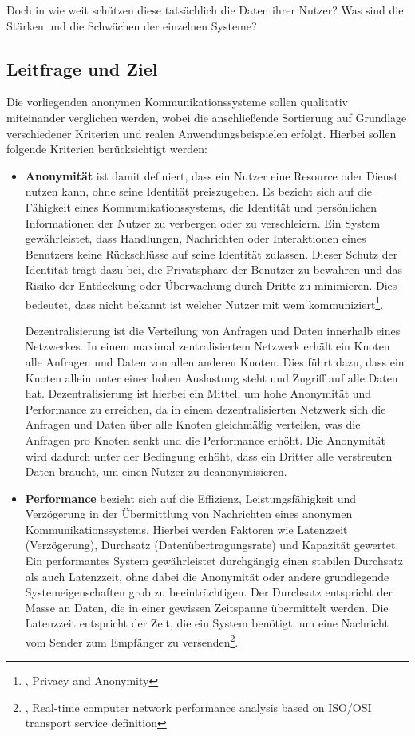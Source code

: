 Doch in wie weit schützen diese tatsächlich die Daten ihrer Nutzer? Was sind die Stärken und die Schwächen der einzelnen Systeme? 

\subsection{Leitfrage und Ziel}

Die vorliegenden anonymen Kommunikationssysteme sollen qualitativ miteinander verglichen werden, wobei die anschließende Sortierung auf Grundlage verschiedener Kriterien und realen Anwendungsbeispielen erfolgt. Hierbei sollen folgende Kriterien berücksichtigt werden:

\begin{itemize}
    \item \textbf{Anonymität} ist damit definiert, dass ein Nutzer eine Resource oder Dienst nutzen kann, ohne seine Identität preiszugeben. Es bezieht sich auf die Fähigkeit eines Kommunikationssystems, die Identität und persönlichen Informationen der Nutzer zu verbergen oder zu verschleiern. Ein System gewährleistet, dass Handlungen, Nachrichten oder Interaktionen eines Benutzers keine Rückschlüsse auf seine Identität zulassen. Dieser Schutz der Identität trägt dazu bei, die Privatsphäre der Benutzer zu bewahren und das Risiko der Entdeckung oder Überwachung durch Dritte zu minimieren. Dies bedeutet, dass nicht bekannt ist welcher Nutzer mit wem kommuniziert\footnote{\cite{DefinitionOfAnonymity}, Privacy and Anonymity}.
    
    Dezentralisierung ist die Verteilung von Anfragen und Daten innerhalb eines Netzwerkes. In einem maximal zentralisiertem Netzwerk erhält ein Knoten alle Anfragen und Daten von allen anderen Knoten. Dies führt dazu, dass ein Knoten allein unter einer hohen Auslastung steht und Zugriff auf alle Daten hat. Dezentralisierung ist hierbei ein Mittel, um hohe Anonymität und Performance zu erreichen, da in einem dezentralisierten Netzwerk sich die Anfragen und Daten über alle Knoten gleichmäßig verteilen, was die Anfragen pro Knoten senkt und die Performance erhöht. Die Anonymität wird dadurch unter der Bedingung erhöht, dass ein Dritter alle verstreuten Daten braucht, um einen Nutzer zu deanonymisieren.
    
    \item \textbf{Performance} bezieht sich auf die Effizienz, Leistungsfähigkeit und Verzögerung in der Übermittlung von Nachrichten eines anonymen Kommunikationssystems. Hierbei werden Faktoren wie Latenzzeit (Verzögerung), Durchsatz (Datenübertragungsrate) und Kapazität gewertet. Ein performantes System gewährleistet durchgängig einen stabilen Durchsatz als auch Latenzzeit, ohne dabei die Anonymität oder andere grundlegende Systemeigenschaften grob zu beeinträchtigen. Der Durchsatz entspricht der Masse an Daten, die in einer gewissen Zeitspanne übermittelt werden. Die Latenzzeit entspricht der Zeit, die ein System benötigt, um eine Nachricht vom Sender zum Empfänger zu versenden\footnote{\cite{ComputerNetworkPerformanceAnalysis}, Real-time computer network performance analysis based on ISO/OSI transport service definition}.
\end{itemize}
